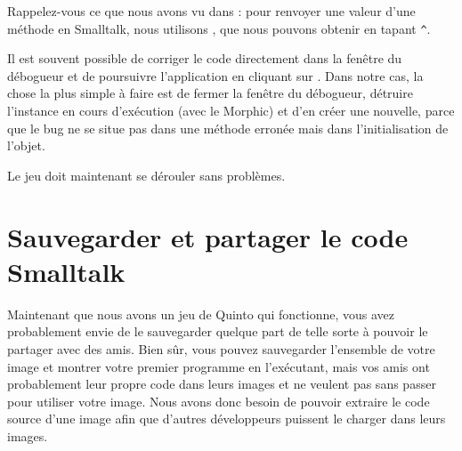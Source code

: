 \documentclass[a4paper,10pt,twoside]{book}
\begin{document}
\noindent
Rappelez-vous ce que nous avons vu dans :
pour renvoyer une valeur d'une méthode en Smalltalk, nous utilisons 
 \ct{^}, que nous pouvons obtenir en tapant \verb|^|.

Il est souvent possible de corriger le code directement dans la
fen\^etre du débogueur et de poursuivre l'application en cliquant sur
.
Dans notre cas, la chose la plus simple à faire est de fermer la
fen\^etre du débogueur, détruire l'instance en cours d'exécution (avec
le  Morphic) et d'en créer une nouvelle, parce que le bug
ne se situe pas dans une méthode erronée mais dans
l'initialisation de l'objet.


Le jeu doit maintenant se dérouler sans problèmes.


\section{Sauvegarder et partager le code Smalltalk}
\label{sec:Monticello}

Maintenant que nous avons un jeu de Quinto qui fonctionne, vous avez
probablement envie de le sauvegarder quelque part de telle sorte à
pouvoir le partager avec des amis. Bien s\^ur, vous pouvez sauvegarder
l'ensemble de votre image \pharo et montrer votre premier programme
en l'exécutant, mais vos amis ont probablement leur propre code dans
leurs images et ne veulent pas sans passer pour utiliser votre image.
Nous avons donc besoin de pouvoir extraire le code source d'une image
\pharo afin que d'autres développeurs puissent le charger dans leurs images.
\end{document}
